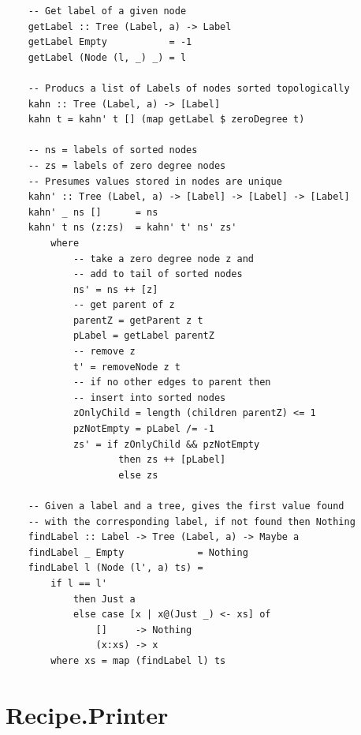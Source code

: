 \documentclass[11pt]{article}
\begin{document}
\begin{tt}
\begin{lstlisting}
    -- Get label of a given node
    getLabel :: Tree (Label, a) -> Label
    getLabel Empty           = -1
    getLabel (Node (l, _) _) = l
    
    -- Producs a list of Labels of nodes sorted topologically
    kahn :: Tree (Label, a) -> [Label]
    kahn t = kahn' t [] (map getLabel $ zeroDegree t)
    
    -- ns = labels of sorted nodes
    -- zs = labels of zero degree nodes
    -- Presumes values stored in nodes are unique
    kahn' :: Tree (Label, a) -> [Label] -> [Label] -> [Label]
    kahn' _ ns []      = ns
    kahn' t ns (z:zs)  = kahn' t' ns' zs'
        where
            -- take a zero degree node z and
            -- add to tail of sorted nodes
            ns' = ns ++ [z]
            -- get parent of z
            parentZ = getParent z t
            pLabel = getLabel parentZ
            -- remove z
            t' = removeNode z t
            -- if no other edges to parent then
            -- insert into sorted nodes
            zOnlyChild = length (children parentZ) <= 1
            pzNotEmpty = pLabel /= -1 
            zs' = if zOnlyChild && pzNotEmpty
                    then zs ++ [pLabel]
                    else zs
    
    -- Given a label and a tree, gives the first value found
    -- with the corresponding label, if not found then Nothing
    findLabel :: Label -> Tree (Label, a) -> Maybe a
    findLabel _ Empty             = Nothing
    findLabel l (Node (l', a) ts) =
        if l == l'
            then Just a
            else case [x | x@(Just _) <- xs] of
                []     -> Nothing
                (x:xs) -> x
        where xs = map (findLabel l) ts
    \end{lstlisting}
    \end{tt}

    \section{Recipe.Printer}
\end{document}
